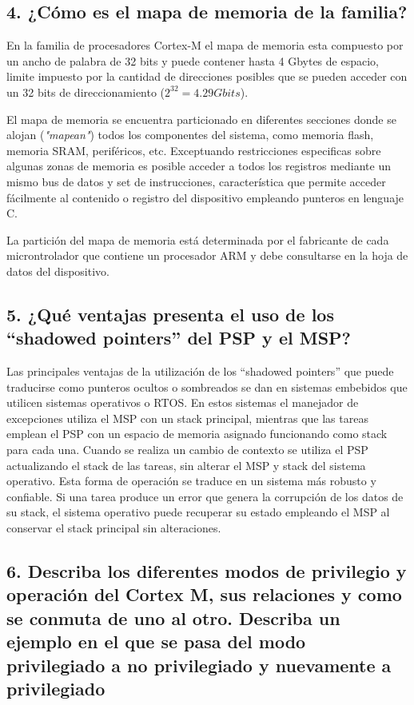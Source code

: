 \documentclass[10pt,a4paper,twoside,spanish]{article}	%
\begin{document}
\subsection*{4. ¿Cómo es el mapa de memoria de la familia?}

En la familia de procesadores Cortex-M el mapa de memoria esta compuesto por un ancho de palabra de 32 bits y puede contener hasta 4 Gbytes de espacio, limite impuesto por la cantidad de direcciones posibles que se pueden acceder con un 32 bits de direccionamiento ($2^{32}=4.29 Gbits$).

El mapa de memoria se encuentra particionado en diferentes secciones donde se alojan (\textit{"mapean"}) todos los componentes del sistema, como memoria flash, memoria SRAM, periféricos, etc. Exceptuando restricciones especificas sobre algunas zonas de memoria es posible acceder a todos los registros mediante un mismo bus de datos y set de instrucciones, característica que permite acceder fácilmente al contenido o registro del dispositivo empleando punteros en lenguaje C.  

La partición del mapa de memoria está determinada por el fabricante de cada microntrolador que contiene un procesador ARM y debe consultarse en la hoja de datos del dispositivo.

\subsection*{5. ¿Qué ventajas presenta el uso de los “shadowed pointers” del PSP y el MSP?}

Las principales ventajas de la utilización de los “shadowed pointers” que puede traducirse como punteros ocultos o sombreados se dan en sistemas embebidos que utilicen sistemas operativos o RTOS. En estos sistemas el manejador de excepciones utiliza el MSP con un stack principal, mientras que las tareas emplean el PSP con un espacio de memoria asignado funcionando como stack para cada una. Cuando se realiza un cambio de contexto se utiliza el PSP  actualizando el stack de las tareas, sin alterar el MSP y stack del sistema operativo.
Esta forma de operación se traduce en un sistema más robusto y confiable. Si una tarea produce un error que genera la corrupción de los datos de su stack, el sistema operativo puede recuperar su estado empleando el MSP al conservar el stack principal sin alteraciones.


\subsection*{6. Describa los diferentes modos de privilegio y operación del Cortex M, sus relaciones y como se conmuta de uno al otro. Describa un ejemplo en el que se pasa del modo privilegiado a no privilegiado y nuevamente a privilegiado}
\end{document}

